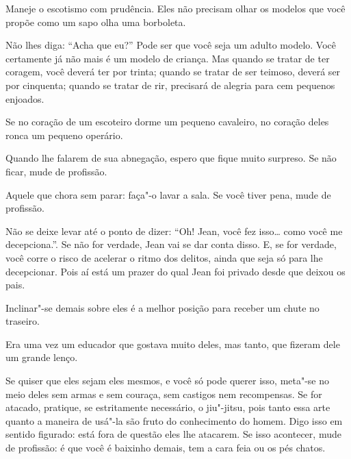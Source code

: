 Maneje o escotismo com prudência. Eles não precisam olhar os modelos que
você propõe como um sapo olha uma borboleta.

\bigskip
\bigskip

Não lhes diga: ``Acha que eu?'' Pode ser que você seja um adulto modelo.
Você certamente já não mais é um modelo de criança. Mas quando se tratar
de ter coragem, você deverá ter por trinta; quando se tratar de ser
teimoso, deverá ser por cinquenta; quando se tratar de rir, precisará de
alegria para cem pequenos enjoados.

\bigskip
\bigskip

Se no coração de um escoteiro dorme um pequeno cavaleiro, no coração
deles ronca um pequeno operário.

\bigskip
\bigskip

Quando lhe falarem de sua abnegação, espero que fique muito surpreso. Se
não ficar, mude de profissão.

\bigskip
\bigskip

Aquele que chora sem parar: faça"-o lavar a sala. Se você tiver pena,
mude de profissão.

\bigskip
\bigskip

Não se deixe levar até o ponto de dizer: ``Oh! Jean, você fez isso\ldots{}
como você me decepciona.''. Se não for verdade, Jean vai se dar conta
disso. E, se for verdade, você corre o risco de acelerar o ritmo dos
delitos, ainda que seja só para lhe decepcionar. Pois aí está um prazer
do qual Jean foi privado desde que deixou os pais.

\bigskip
\bigskip

Inclinar"-se demais sobre eles é a melhor posição para receber um chute
no traseiro.

\bigskip
\bigskip

Era uma vez um educador que gostava muito deles, mas tanto, que fizeram
dele um grande lenço.

\bigskip
\bigskip

Se quiser que eles sejam eles mesmos, e você só pode querer isso,
meta"-se no meio deles sem armas e sem couraça, sem castigos nem
recompensas. Se for atacado, pratique, se estritamente necessário, o
jiu"-jitsu, pois tanto essa arte quanto a maneira de usá"-la são fruto do
conhecimento do homem. Digo isso em sentido figurado: está fora de
questão eles lhe atacarem. Se isso acontecer, mude de profissão: é que
você é baixinho demais, tem a cara feia ou os pés chatos.

\bigskip
\bigskip

